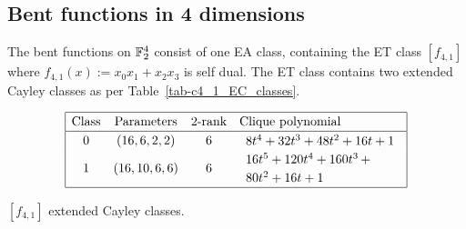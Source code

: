 \subsection{Bent functions in 4 dimensions}
%
The bent functions on $\mathbb{F}_2^4$ consist of one EA class, containing the ET class $[f_{4,1}]$ where
$f_{4,1}(x) := x_0 x_1 + x_2 x_3$ is self dual.
The ET class contains two extended Cayley classes as per Table~\ref{tab-c4_1_EC_classes}.
\begin{table}[!bhpt] %
\small{
\begin{align*}
\def\arraystretch{1.2}
\begin{array}{|cccl|}
\hline
\text{Class} &
\text{Parameters} &
\text{2-rank} &
\text{Clique polynomial}
\\
\hline
0 &
(16, 6, 2, 2) &
6 &
\begin{array}{l}
8t^{4} + 32t^{3} + 48t^{2} + 16t + 1
\end{array}
\\
1 &
(16, 10, 6, 6) &
6 &
\begin{array}{l}
16t^{5} + 120t^{4} + 160t^{3}
\,+
\\
 80t^{2} + 16t + 1
\end{array}
\\
\hline
\end{array}
\end{align*}
}
\caption{$[f_{4,1}]$ extended Cayley classes.}
\label{tab-c4_1_EC_classes}
\end{table}

%

